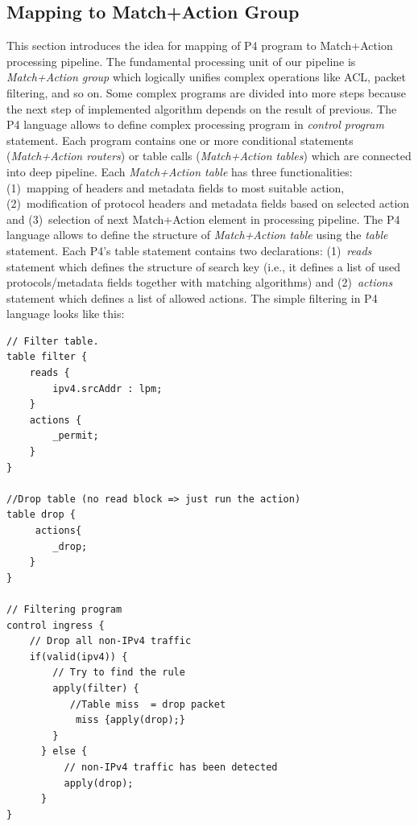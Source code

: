 \subsection{Mapping to Match+Action Group}
\label{sec:mappingControlToMaGroup}
This section introduces the idea for mapping of P4 program to Match+Action processing pipeline. 
The fundamental processing unit of our pipeline is \emph{Match+Action group} which logically unifies complex operations 
like ACL, packet filtering, and so on. 
Some complex programs are divided into more steps because the next step of implemented algorithm depends on the result of previous. 
The P4 language allows to define complex processing program in \textit{control program} statement. 
Each program contains one or more conditional statements (\emph{Match+Action routers}) or table calls (\emph{Match+Action tables}) 
which are connected into deep pipeline. Each \emph{Match+Action table} has three functionalities: (1)~mapping of headers and 
metadata fields to most suitable action, (2)~modification of protocol headers and metadata fields based on selected action and 
(3)~selection of next Match+Action element in processing pipeline. 
The P4 language allows to define the structure of \emph{Match+Action table} using the \textit{table} statement. 
Each P4's table statement contains two declarations: (1)~\textit{reads} statement which defines the structure of search key 
(i.e., it defines a list of used protocols/metadata fields together with matching algorithms) and 
(2)~\textit{actions} statement which defines a list of allowed actions. The simple filtering in P4 language looks like this:
\begin{Verbatim}[fontsize=\small]
// Filter table.
table filter {
    reads {
        ipv4.srcAddr : lpm;
    }
    actions {
        _permit;
    }
}

//Drop table (no read block => just run the action)
table drop {
     actions{
        _drop;
    }
}

// Filtering program
control ingress {
    // Drop all non-IPv4 traffic
    if(valid(ipv4)) {
        // Try to find the rule 
        apply(filter) {
           //Table miss  = drop packet
            miss {apply(drop);}
        }
      } else {
          // non-IPv4 traffic has been detected
          apply(drop);
      }
}
\end{Verbatim}

